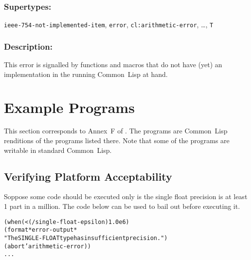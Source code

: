 \documentclass[10pt,fleqn]{article}
\newcommand{\CL}{\textsf{Common~Lisp}}
\newcommand{\code}[1]{\texttt{#1}}
\newcommand{\DSupertypes}{\subsubsection*{Supertypes:}}
\newcommand{\DDescription}{\subsubsection*{Description:}}
\begin{document}
\DSupertypes{}

\code{ieee-754-not-implemented-item}, \code{error},
\code{cl:arithmetic-error}, \ldots, \code{T}

\DDescription{}

This error is signalled by functions and macros that do not have (yet)
an implementation in the running \CL{} at hand.


\newpage

\nocite{2012:LIA1,2001:LIA2,2004:LIA3}
\nocite{1994:ANSICL}





  
  



\appendix

\section{Example Programs}

This section corresponds to Annex~F of \cite{2012:LIA1}.  The programs
are \CL{} renditions of the programs listed there.  Note that some of
the programs are writable in standard \CL{}.

\subsection{Verifying Platform Acceptability}

Soppose some code should be executed only is the single float
precision is at least 1 part in a million.  The code below can be used
to bail out before executing it.
\begin{alltt}
    (when (< (/ single-float-epsilon) 1.0e6)
        (format *error-output*
                "The SINGLE-FLOAT type has insufficient precision.")
        (abort 'arithmetic-error))
    ...
\end{alltt}
\end{document}
